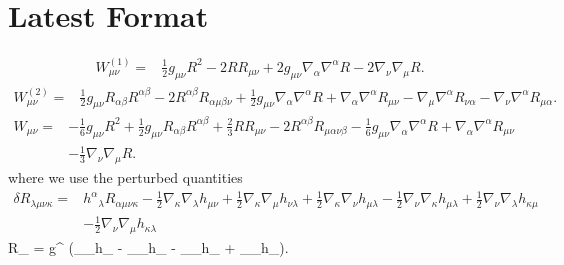 \documentclass[10pt,letterpaper]{article}
\begin{document}
\section*{Latest Format}
\begin{align}
W^{(1)}_{\mu\nu}={}&\tfrac{1}{2} g_{\mu \nu} R^2
 - 2 R R_{\mu \nu}
 + 2 g_{\mu \nu} \nabla_{\alpha}\nabla^{\alpha}R
 - 2 \nabla_{\nu}\nabla_{\mu}R.
\end{align}
\begin{align}
W^{(2)}_{\mu\nu}={}&\tfrac{1}{2} g_{\mu \nu} R_{\alpha \beta} R^{\alpha \beta}
 - 2 R^{\alpha \beta} R_{\alpha \mu \beta \nu}
 + \tfrac{1}{2} g_{\mu \nu} \nabla_{\alpha}\nabla^{\alpha}R
 + \nabla_{\alpha}\nabla^{\alpha}R_{\mu \nu}
 -  \nabla_{\mu}\nabla^{\alpha}R_{\nu \alpha}
 -  \nabla_{\nu}\nabla^{\alpha}R_{\mu \alpha}.
\end{align}
\begin{align}
W_{\mu\nu}={}&- \tfrac{1}{6} g_{\mu \nu} R^2
 + \tfrac{1}{2} g_{\mu \nu} R_{\alpha \beta} R^{\alpha \beta}
 + \tfrac{2}{3} R R_{\mu \nu}
 - 2 R^{\alpha \beta} R_{\mu \alpha \nu \beta}
 -  \tfrac{1}{6} g_{\mu \nu} \nabla_{\alpha}\nabla^{\alpha}R
 + \nabla_{\alpha}\nabla^{\alpha}R_{\mu \nu}\nonumber\\
& -  \tfrac{1}{3} \nabla_{\nu}\nabla_{\mu}R.
\end{align}
where we use the perturbed quantities
\begin{align}
\delta R_{\lambda\mu\nu\kappa}={}&h^{\alpha}{}_{\lambda} R_{\alpha \mu \nu \kappa}
 -  \tfrac{1}{2} \nabla_{\kappa}\nabla_{\lambda}h_{\mu \nu}
 + \tfrac{1}{2} \nabla_{\kappa}\nabla_{\mu}h_{\nu \lambda}
 + \tfrac{1}{2} \nabla_{\kappa}\nabla_{\nu}h_{\mu \lambda}
 -  \tfrac{1}{2} \nabla_{\nu}\nabla_{\kappa}h_{\mu \lambda}
 + \tfrac{1}{2} \nabla_{\nu}\nabla_{\lambda}h_{\kappa \mu}\nonumber\\
& -  \tfrac{1}{2} \nabla_{\nu}\nabla_{\mu}h_{\kappa \lambda}
\end{align}
\be
	\delta R_{\mu\nu} =  g^{\alpha \beta} (\nabla_{\alpha}\nabla_{\beta}h_{\mu \nu} -  \nabla_{\alpha}\nabla_{\mu}h_{\beta \nu} -  \nabla_{\alpha}\nabla_{\nu}h_{\beta \mu} + \nabla_{\nu}\nabla_{\mu}h_{\alpha \beta}).
\ee
\end{document}

